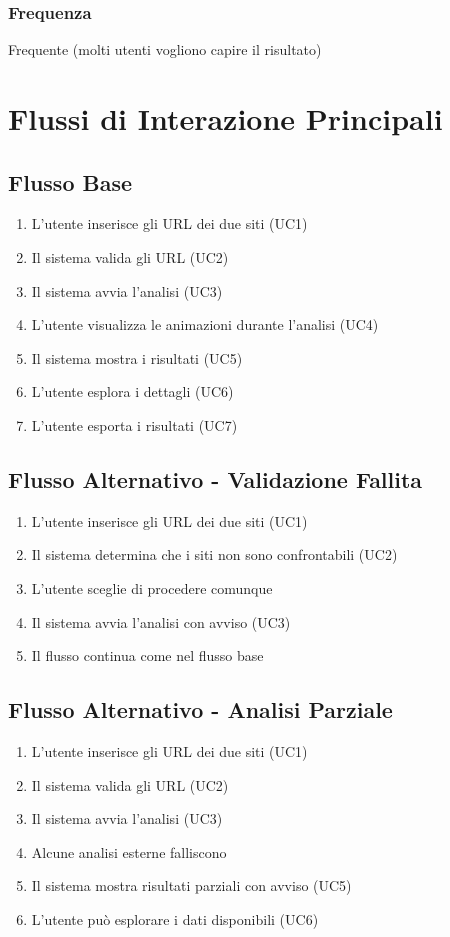 \subsubsection{Frequenza}
Frequente (molti utenti vogliono capire il risultato)

\section{Flussi di Interazione Principali}

\subsection{Flusso Base}
\begin{enumerate}
    \item L'utente inserisce gli URL dei due siti (UC1)
    \item Il sistema valida gli URL (UC2)
    \item Il sistema avvia l'analisi (UC3)
    \item L'utente visualizza le animazioni durante l'analisi (UC4)
    \item Il sistema mostra i risultati (UC5)
    \item L'utente esplora i dettagli (UC6)
    \item L'utente esporta i risultati (UC7)
\end{enumerate}

\subsection{Flusso Alternativo - Validazione Fallita}
\begin{enumerate}
    \item L'utente inserisce gli URL dei due siti (UC1)
    \item Il sistema determina che i siti non sono confrontabili (UC2)
    \item L'utente sceglie di procedere comunque
    \item Il sistema avvia l'analisi con avviso (UC3)
    \item Il flusso continua come nel flusso base
\end{enumerate}

\subsection{Flusso Alternativo - Analisi Parziale}
\begin{enumerate}
    \item L'utente inserisce gli URL dei due siti (UC1)
    \item Il sistema valida gli URL (UC2)
    \item Il sistema avvia l'analisi (UC3)
    \item Alcune analisi esterne falliscono
    \item Il sistema mostra risultati parziali con avviso (UC5)
    \item L'utente può esplorare i dati disponibili (UC6)
\end{enumerate}

